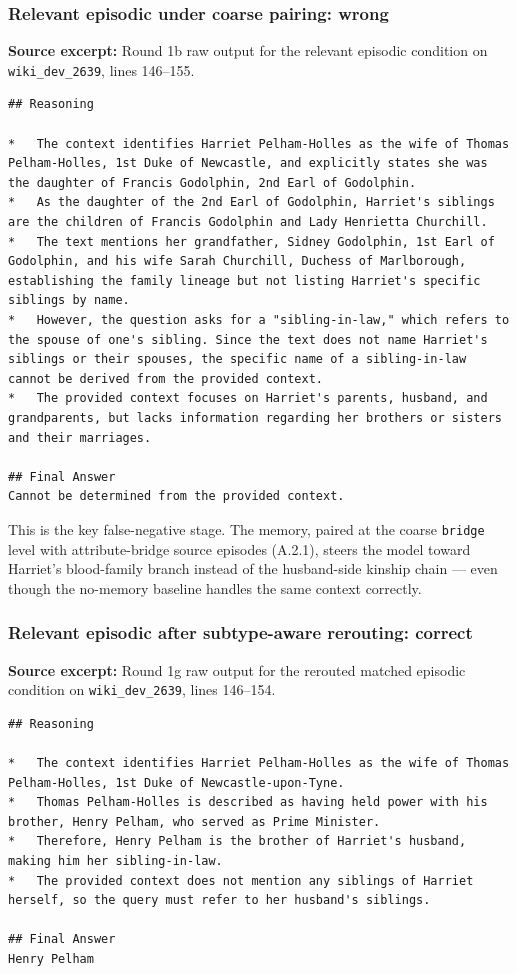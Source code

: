 \subsubsection{Relevant episodic under coarse pairing: wrong}

\textbf{Source excerpt:} Round 1b raw output for the relevant episodic condition on \texttt{wiki\_dev\_2639}, lines 146--155.

\begin{lstlisting}
## Reasoning

*   The context identifies Harriet Pelham-Holles as the wife of Thomas Pelham-Holles, 1st Duke of Newcastle, and explicitly states she was the daughter of Francis Godolphin, 2nd Earl of Godolphin.
*   As the daughter of the 2nd Earl of Godolphin, Harriet's siblings are the children of Francis Godolphin and Lady Henrietta Churchill.
*   The text mentions her grandfather, Sidney Godolphin, 1st Earl of Godolphin, and his wife Sarah Churchill, Duchess of Marlborough, establishing the family lineage but not listing Harriet's specific siblings by name.
*   However, the question asks for a "sibling-in-law," which refers to the spouse of one's sibling. Since the text does not name Harriet's siblings or their spouses, the specific name of a sibling-in-law cannot be derived from the provided context.
*   The provided context focuses on Harriet's parents, husband, and grandparents, but lacks information regarding her brothers or sisters and their marriages.

## Final Answer
Cannot be determined from the provided context.
\end{lstlisting}

This is the key false-negative stage. The memory, paired at the coarse \texttt{bridge} level with attribute-bridge source episodes (A.2.1), steers the model toward Harriet's blood-family branch instead of the husband-side kinship chain --- even though the no-memory baseline handles the same context correctly.

\subsubsection{Relevant episodic after subtype-aware rerouting: correct}

\textbf{Source excerpt:} Round 1g raw output for the rerouted matched episodic condition on \texttt{wiki\_dev\_2639}, lines 146--154.

\begin{lstlisting}
## Reasoning

*   The context identifies Harriet Pelham-Holles as the wife of Thomas Pelham-Holles, 1st Duke of Newcastle-upon-Tyne.
*   Thomas Pelham-Holles is described as having held power with his brother, Henry Pelham, who served as Prime Minister.
*   Therefore, Henry Pelham is the brother of Harriet's husband, making him her sibling-in-law.
*   The provided context does not mention any siblings of Harriet herself, so the query must refer to her husband's siblings.

## Final Answer
Henry Pelham
\end{lstlisting}

